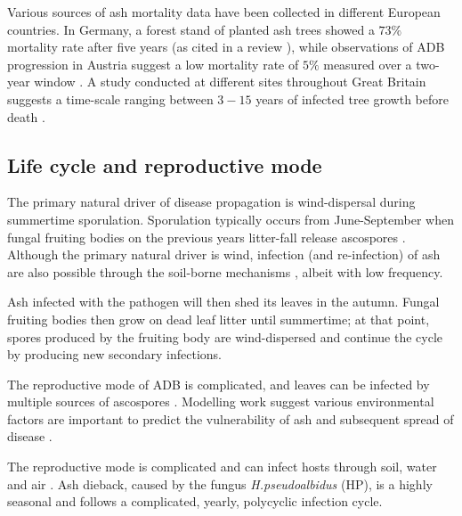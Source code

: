  Various sources of ash mortality data have been collected in different European countries. 
 In Germany, a forest stand of planted ash trees showed a $73\%$ mortality rate after five years \cite{langer2015ash} (as cited in a review \cite{enderle2017ash}), while observations of ADB progression in Austria suggest a low mortality rate of $5\%$ measured over a two-year window \cite{kessler2012dieback}. 
 A study conducted at different sites throughout Great Britain suggests a time-scale ranging between $3-15$ years of infected tree growth before death \cite{wylder2018evidence}.

\subsection{Life cycle and reproductive mode}

The primary natural driver of disease propagation is wind-dispersal during summertime sporulation.
Sporulation typically occurs from June-September when fungal fruiting bodies on the previous years litter-fall release ascospores \cite{grosdidier2018tracking, hietala2013invasive}.
Although the primary natural driver is wind, infection (and re-infection) of ash are also possible through the soil-borne mechanisms \cite{fones2016role}, albeit with low frequency.

Ash infected with the pathogen will then shed its leaves in the autumn. Fungal fruiting bodies then grow on dead leaf litter until summertime; at that point, spores produced by the fruiting body are wind-dispersed and continue the cycle by producing new secondary infections.%

The reproductive mode of ADB is complicated, and leaves can be infected by multiple sources of ascospores \cite{gross2012reproductive}.
Modelling work suggest various environmental factors are important to predict the vulnerability of ash and subsequent spread of disease \cite{dal2014risk, chumanova2019predicting}.

The reproductive mode is complicated and can infect hosts through soil, water and air \cite{gross2012reproductive}.
Ash dieback, caused by the fungus \textit{H.pseudoalbidus} (HP), is a highly seasonal \cite{bengtsson2014seasonal} and follows a complicated, yearly, polycyclic infection cycle.


